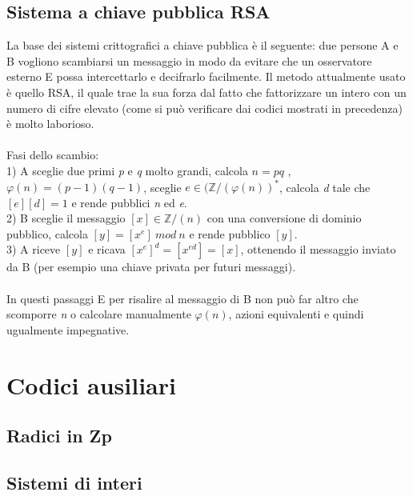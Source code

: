 \documentclass{article}
\begin{document}
	\subsection{Sistema a chiave pubblica RSA}
	La base dei sistemi crittografici a chiave pubblica è il seguente: due persone A e B vogliono scambiarsi un messaggio in modo da evitare che un osservatore esterno E possa intercettarlo e decifrarlo facilmente. Il metodo attualmente usato è quello RSA, il quale trae la sua forza dal fatto che fattorizzare un intero con un numero di cifre elevato (come si può verificare dai codici mostrati in precedenza) è molto laborioso.\\ \\ Fasi dello scambio:\\
	1) A sceglie due primi \textit{p} e \textit{q} molto grandi, calcola \(n=pq\) , \(\varphi(n)=(p-1)(q-1)\), sceglie \(e\in(\mathbb{Z}/(\varphi(n))^*\), calcola \textit{d} tale che \([e][d]=1\) e rende pubblici \textit{n} ed \textit{e}.\\
	2) B sceglie il messaggio \([x]\in\mathbb{Z}/(n)\) con una conversione di dominio pubblico, calcola \([y]=[x^e]\ mod\ n\) e rende pubblico \([y]\).\\
	3) A riceve \([y]\) e ricava \([x^e]^d=[x^{ed}]=[x]\), ottenendo il messaggio inviato da B (per esempio una chiave privata per futuri messaggi).\\ \\
	In questi passaggi E per risalire al messaggio di B non può far altro che scomporre \textit{n} o calcolare manualmente \(\varphi(n)\), azioni equivalenti e quindi ugualmente impegnative.
	
	\newpage
	\section{Codici ausiliari}
	\subsection{Radici in Zp}
	\vspace{1cm}
	
	\vspace{1cm}\vspace{1cm}
	\subsection{Sistemi di interi}
	\vspace{1cm}
	
	\vspace{1cm}\vspace{1cm}
\end{document}
